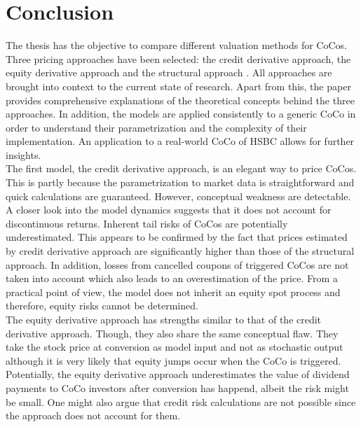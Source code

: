 \chapter{Conclusion}
The thesis has the objective to compare different valuation methods for CoCos. Three pricing approaches have been selected: the credit derivative approach, the equity derivative approach \citep{de2011pricing} and the structural approach \citep{pennacchi2010structural}. All approaches are brought into context to the current state of research. Apart from this, the paper provides comprehensive explanations of the theoretical concepts behind the three approaches.  In addition, the models are applied consistently to a generic CoCo in order to understand their parametrization and the complexity of their implementation. An application to a real-world CoCo of HSBC allows for further insights.\\

The first model, the credit derivative approach, is an elegant way to price CoCos. This is partly because the parametrization to market data is straightforward and quick calculations are guaranteed. However, conceptual weakness are detectable. A closer look into the model dynamics suggests that it does not account for discontinuous returns. Inherent tail risks of CoCos are potentially underestimated. This appears to be confirmed by the fact that prices estimated by credit derivative approach are significantly higher than those of the structural approach. In addition, losses from cancelled coupons of triggered CoCos are not taken into account which also leads to an overestimation of the price. From a practical point of view, the model does not inherit an equity spot process and therefore, equity risks cannot be determined. \citep{turfus2015cocos}\\

The equity derivative approach has strengths similar to that of the credit derivative approach. Though, they also share the same conceptual flaw. They take the stock price at conversion as model input and not as stochastic output although it is very likely that equity jumps occur when the CoCo is triggered. \citep{turfus2015cocos} Potentially, the equity derivative approach underestimates the value of dividend payments to CoCo investors after conversion has happend, albeit the risk might be small. One might also argue that credit risk calculations are not possible since the approach does not account for them. \citep{turfus2015cocos} \\


